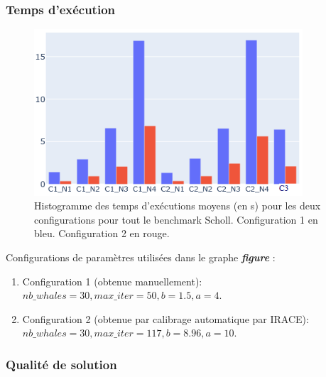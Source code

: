 \documentclass[12pt]{article}
\begin{document}
\subsubsection{Temps d'exécution }
\begin{figure}[h!]
    \includegraphics[width=10cm]{../figures/WOA/woa_texec.png}
    \caption{Histogramme des temps d'exécutions moyens (en s) pour les deux configurations pour tout le benchmark Scholl. Configuration 1 en bleu. Configuration 2 en rouge.}
    \label{fig:texec}
\end{figure}
Configurations de paramètres utilisées dans le graphe \textbf{\emph{figure }}:
\begin{enumerate}
    \item Configuration 1 (obtenue manuellement): \(nb\_whales=30, max\_iter=50, b=1.5, a=4\).
    \item Configuration 2 (obtenue par calibrage automatique par IRACE): \( nb\_whales=30, max\_iter=117, b=8.96, a=10\).
\end{enumerate}

\subsubsection{Qualité de solution }
\end{document}
